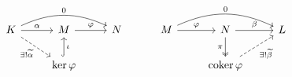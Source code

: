\documentclass{article}
\begin{document}
    \begin{equation*}
        \begin{tikzcd}
            K \ar[r, "\alpha"] \ar[dr, "\ex!\widetilde{\alpha}"', dashed] \ar[rr, "0", bend left=25] & M \ar[r, "\phi"] & N \\
                                                                                                    & \ker\phi \ar[u, "\iota"', hookrightarrow]
        \end{tikzcd}\ \ \ \ \ \ \ \ 
        \begin{tikzcd}
            M \ar[r, "\phi"] \ar[rr, "0", bend left=25] & N \ar[d, "\pi"', twoheadrightarrow] \ar[r, "\beta"] & L \\
                                                        & \coker\phi \ar[ur, "\ex!\widetilde{\beta}"', dashed]
        \end{tikzcd}
    \end{equation*}
\end{document}
